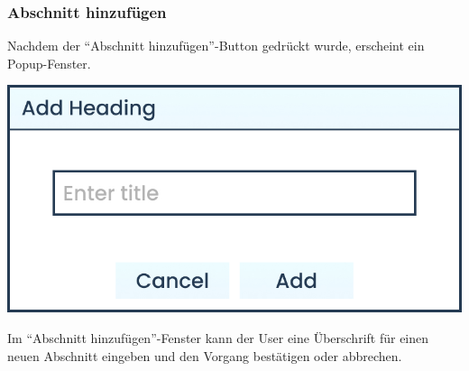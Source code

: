 \clearpage

\subsubsection{Abschnitt hinzufügen}

Nachdem der \enquote{Abschnitt hinzufügen}-Button gedrückt wurde, erscheint ein Popup-Fenster.

\begin{center}
  \begin{minipage}{0.5\linewidth}
    \includegraphics[width=\textwidth]{assets/img/Add_Heading_Box}
  \end{minipage}
\end{center}

Im \enquote{Abschnitt hinzufügen}-Fenster kann der User eine Überschrift für einen neuen Abschnitt eingeben und den
Vorgang bestätigen oder abbrechen.

